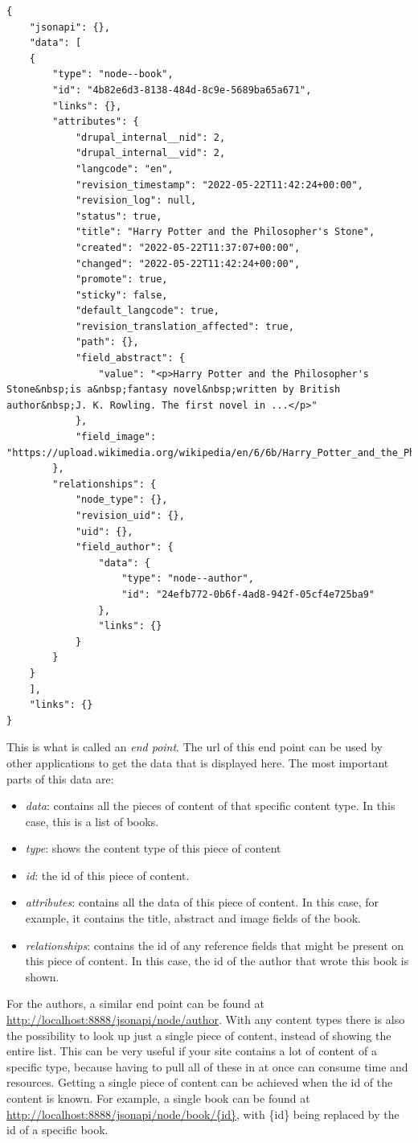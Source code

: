 \begin{lstlisting}
{
	"jsonapi": {},
	"data": [
	{
		"type": "node--book",
		"id": "4b82e6d3-8138-484d-8c9e-5689ba65a671",
		"links": {},
		"attributes": {
			"drupal_internal__nid": 2,
			"drupal_internal__vid": 2,
			"langcode": "en",
			"revision_timestamp": "2022-05-22T11:42:24+00:00",
			"revision_log": null,
			"status": true,
			"title": "Harry Potter and the Philosopher's Stone",
			"created": "2022-05-22T11:37:07+00:00",
			"changed": "2022-05-22T11:42:24+00:00",
			"promote": true,
			"sticky": false,
			"default_langcode": true,
			"revision_translation_affected": true,
			"path": {},
			"field_abstract": {
				"value": "<p>Harry Potter and the Philosopher's Stone&nbsp;is a&nbsp;fantasy novel&nbsp;written by British author&nbsp;J. K. Rowling. The first novel in ...</p>"
			},
			"field_image": "https://upload.wikimedia.org/wikipedia/en/6/6b/Harry_Potter_and_the_Philosopher%27s_Stone_Book_Cover.jpg"
		},
		"relationships": {
			"node_type": {},
			"revision_uid": {},
			"uid": {},
			"field_author": {
				"data": {
					"type": "node--author",
					"id": "24efb772-0b6f-4ad8-942f-05cf4e725ba9"
				},
				"links": {}
			}
		}
	}
	],
	"links": {}
}
\end{lstlisting}

This is what is called an \emph{end point}. The url of this end point can be used by other applications to get the data that is displayed here. The most important parts of this data are:

\begin{itemize}
	\item \emph{data}: contains all the pieces of content of that specific content type. In this case, this is a list of books.
	\item \emph{type}: shows the content type of this piece of content
	\item \emph{id}: the id of this piece of content.
	\item \emph{attributes}: contains all the data of this piece of content. In this case, for example, it contains the title, abstract and image fields of the book.
	\item \emph{relationships}: contains the id of any reference fields that might be present on this piece of content. In this case, the id of the author that wrote this book is shown.
\end{itemize}

For the authors, a similar end point can be found at \url{http://localhost:8888/jsonapi/node/author}. With any content types there is also the possibility to look up just a single piece of content, instead of showing the entire list. This can be very useful if your site contains a lot of content of a specific type, because having to pull all of these in at once can consume time and resources. Getting a single piece of content can be achieved when the id of the content is known. For example, a single book can be found at \url{http://localhost:8888/jsonapi/node/book/{id}}, with \{id\} being replaced by the id of a specific book.


